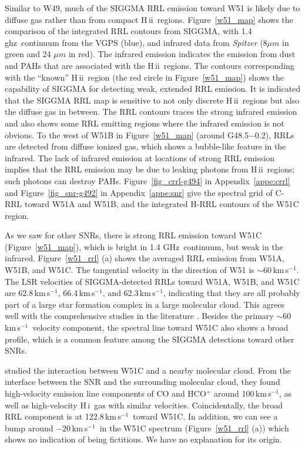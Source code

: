 \documentclass[manuscript]{aastex61}
\newcommand{\hii}{{\rm H\,}{{\sc ii}}}
\newcommand{\hi}{{\rm H\,}{{\sc i}}}
\newcommand{\kms}{\,km\,s$^{-1}$}
\newcommand{\ghz}{\,GHz}
\newcommand{\um}{\mu m}
\begin{document}
Similar to W49, much of the SIGGMA RRL emission toward W51 is likely due to diffuse gas rather than from compact \hii\ regions.
Figure~\ref{w51_map} shows the comparison of the integrated RRL contours from SIGGMA, with 1.4\,ghz\ continuum from the VGPS (blue), and  infrared data from {\it Spitzer} (8$\um$ in green and 24 $\um$ in red).
The infrared emission indicates the emission from dust and PAHs that are associated with the \hii\ regions.
The contours corresponding with the ``known'' \hii\ region (the red circle in Figure~\ref{w51_map}) shows the capability of SIGGMA for detecting weak, extended RRL emission.
It is indicated that the SIGGMA RRL map is sensitive to not only discrete \hii\ regions but also the diffuse gas in between.
The RRL contours traces the strong infrared emission and also shows some RRL emitting regions where the infrared emission is not obvious.
To the west of W51B in Figure~\ref{w51_map} (around G48.5$-$0.2), RRLs are detected from diffuse ionized gas, which shows a bubble-like feature in the infrared.
The lack of infrared emission at locations of strong RRL emission implies that the RRL emission may be due to leaking photons from \hii\ regions; such photons can destroy PAHs.
Figure~\ref{fig_crrl-g494} in Appendix~\ref{appe:crrl} and Figure~\ref{fig_snr-g492} in Appendix~\ref {appe:snr} give the spectral grid of C-RRL toward W51A and W51B, and the integrated H-RRL contours of the W51C region.

As we saw for other SNRs, there is strong RRL emission toward W51C (Figure~\ref{w51_map}), which is bright in 1.4\,\ghz\ continuum, but weak in the infrared.
Figure~\ref{w51_rrl} (a) shows the averaged RRL emission from W51A, W51B, and W51C.
The tangential velocity in the direction of W51 is $\sim60$\kms.
The LSR velocities of SIGGMA-detected RRLs toward W51A, W51B, and W51C are 62.8\kms, 66.4\kms, and 62.3\kms, indicating that they are all probably part of a large star formation complex in a large molecular cloud.
This agrees well with the comprehensive studies in the literature \citep{Mufson1979, Mehringer1994, Brogan2013}.
Besides the primary $\sim60$\kms\ velocity component, the spectral line toward W51C also shows a broad profile, which is a common feature among the SIGGMA detections toward other SNRs.

\citet{Koo1997a, Koo1997b} studied the interaction between W51C and a nearby molecular cloud.
From the interface between the SNR and the surrounding molecular cloud, they found high-velocity emission line components of CO and HCO$^{+}$ around 100\kms, as well as high-velocity \hi\ gas with similar velocities.
Coincidentally, the broad RRL component is at 122.8\kms\ toward W51C.
In addition, we can see a bump around $-20$\kms\ in the W51C spectrum (Figure~\ref{w51_rrl} (a)) which shows no indication of being fictitious.  We have no explanation for its origin.
\end{document}
